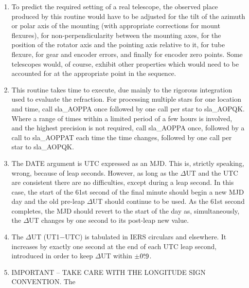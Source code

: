 \documentclass[11pt,twoside]{article}
\newcommand{\tseci}[1]   {$#1$\mbox{$^{\rm s}$}}
\newcommand{\tsec}[2]    {\tseci{#1}$\hspace{-0.3em}.#2$}
\renewcommand{\tsec}[2] {$#1^{\rm s}\hspace{-0.3em}.#2$}
\begin{document}
{\begin{enumerate}
        motion, and is the position that would be seen by a perfect
        equatorial located at the observer and with its polar axis
        aligned to the Earth's axis of rotation ({\it n.b.}\ not to the
        refracted pole).  Finally, the $\alpha$ is obtained by subtracting
        the {\it h}\/ from the local apparent ST.
  \item To predict the required setting of a real telescope, the
        observed place produced by this routine would have to be
        adjusted for the tilt of the azimuth or polar axis of the
        mounting (with appropriate corrections for mount flexures),
        for non-perpendicularity between the mounting axes, for the
        position of the rotator axis and the pointing axis relative
        to it, for tube flexure, for gear and encoder errors, and
        finally for encoder zero points.  Some telescopes would, of
        course, exhibit other properties which would need to be
        accounted for at the appropriate point in the sequence.
  \item This routine takes time to execute, due mainly to the
        rigorous integration used to evaluate the refraction.
        For processing multiple stars for one location and time,
        call sla\_AOPPA once followed by one call per star to sla\_AOPQK.
        Where a range of times within a limited period of a few hours
        is involved, and the highest precision is not required, call
        sla\_AOPPA once, followed by a call to sla\_AOPPAT each time the
        time changes, followed by one call per star to sla\_AOPQK.
  \item The DATE argument is UTC expressed as an MJD.  This is,
        strictly speaking, wrong, because of leap seconds.  However,
        as long as the $\Delta$UT and the UTC are consistent there
        are no difficulties, except during a leap second.  In this
        case, the start of the 61st second of the final minute should
        begin a new MJD day and the old pre-leap $\Delta$UT should
        continue to be used.  As the 61st second completes, the MJD
        should revert to the start of the day as, simultaneously,
        the $\Delta$UT changes by one second to its post-leap new value.
  \item The $\Delta$UT (UT1$-$UTC) is tabulated in IERS circulars and
        elsewhere.  It increases by exactly one second at the end of
        each UTC leap second, introduced in order to keep $\Delta$UT
        within $\pm$\tsec{0}{9}.
  \item IMPORTANT -- TAKE CARE WITH THE LONGITUDE SIGN CONVENTION.  The

\end{enumerate}}
\end{document}
